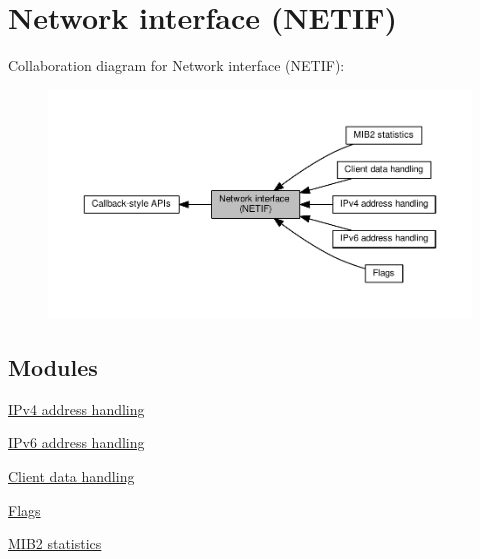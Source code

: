 \hypertarget{group__netif}{}\section{Network interface (N\+E\+T\+IF)}
\label{group__netif}
Collaboration diagram for Network interface (N\+E\+T\+IF)\+:
\nopagebreak
\begin{figure}[H]
\begin{center}
\leavevmode
\includegraphics[width=350pt]{group__netif}
\end{center}
\end{figure}
\subsection*{Modules}
\begin{DoxyCompactItemize}
\item 
\hyperlink{group__netif__ip4}{I\+Pv4 address handling}
\item 
\hyperlink{group__netif__ip6}{I\+Pv6 address handling}
\item 
\hyperlink{group__netif__cd}{Client data handling}
\item 
\hyperlink{group__netif__flags}{Flags}
\item 
\hyperlink{group__netif__mib2}{M\+I\+B2 statistics}
\end{DoxyCompactItemize}
